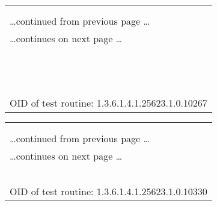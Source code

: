 \documentclass{article}
\begin{document}
\begin{longtable}{|p{}|}
\hline
\rowcolor{openvas_log}{\color{white}{Log (CVSS: 0.0) }}\\
\rowcolor{openvas_log}{\color{white}{NVT: SSH Server type and version}}\\
\hline
\endfirsthead
\hfill\ldots continued from previous page \ldots \\
\hline
\endhead
\hline
\ldots continues on next page \ldots \\
\endfoot
\hline
\endlastfoot
\\
\rowcolor{white}{\verb=Detected SSH server version: SSH-2.0-OpenSSH_5.6=}\\
\rowcolor{white}{\verb=Remote SSH supported authentication: none,password,publickey,hostbased,keyboard-=}\\
\rowcolor{white}{$\hookrightarrow$\verb=interactive =}\\
\rowcolor{white}{\verb=Remote SSH banner: =}\\
\rowcolor{white}{\verb=(not available)=}\\
\rowcolor{white}{\verb=CPE: cpe:/a:openbsd:openssh:5.6=}\\
\rowcolor{white}{\verb=Concluded from remote connection attempt with credentials:=}\\
\rowcolor{white}{\verb=  Login: OpenVAS=}\\
\rowcolor{white}{\verb=  Password: OpenVAS=}\\
\rowcolor{white}{\verb==}\\
\rowcolor{white}{\verb==}\\
\\
OID of test routine: 1.3.6.1.4.1.25623.1.0.10267\\
\end{longtable}

\begin{longtable}{|p{}|}
\hline
\rowcolor{openvas_log}{\color{white}{Log (CVSS: 0.0) }}\\
\rowcolor{openvas_log}{\color{white}{NVT: Services}}\\
\hline
\endfirsthead
\hfill\ldots continued from previous page \ldots \\
\hline
\endhead
\hline
\ldots continues on next page \ldots \\
\endfoot
\hline
\endlastfoot
\\
\rowcolor{white}{\verb=An ssh server is running on this port=}\\
\rowcolor{white}{\verb==}\\
\rowcolor{white}{\verb==}\\
\\
OID of test routine: 1.3.6.1.4.1.25623.1.0.10330\\
\end{longtable}
\end{document}
